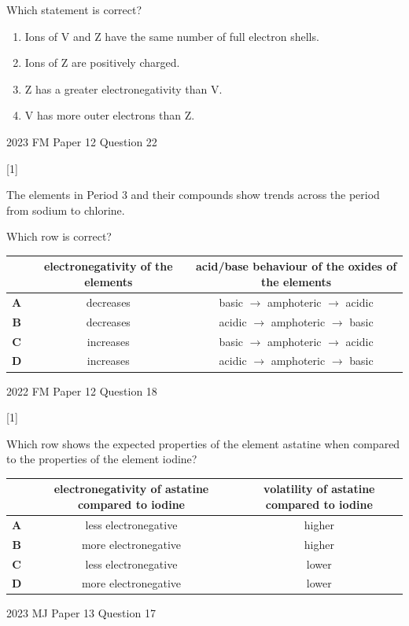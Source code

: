 \documentclass[10pt,a4paper]{article}
\newcommand{\qhead}[2]{%
  \par\vspace{0.28em}%
  \Needspace{4.2em}%
  \noindent{\small\textbf{#1}}\hfill{\small[#2]}\par\vspace{0.08em}%
}
\newcommand{\sourcefoot}[1]{%
  {\footnotesize\color{gray}#1}\par
}
\begin{document}
\vspace{0.12em}
{\small Which statement is correct?}
\begin{enumerate}[label=\textbf{\Alph*}, leftmargin=1.7em, itemsep=0.08em]
\item Ions of V and Z have the same number of full electron shells.
\item Ions of Z are positively charged.
\item Z has a greater electronegativity than V.
\item V has more outer electrons than Z.
\end{enumerate}
\sourcefoot{2023 FM Paper 12 Question 22}

\Needspace{11em}
\qhead{A3.}{1}
{\small The elements in Period 3 and their compounds show trends across the period from sodium to chlorine.}

{\small Which row is correct?}

\vspace{0.12em}
\centering
{\small
\begin{tabular}{ccc}
\toprule
 & electronegativity of the elements & acid/base behaviour of the oxides of the elements \\
\midrule
\textbf{A} & decreases & basic $\rightarrow$ amphoteric $\rightarrow$ acidic \\
\textbf{B} & decreases & acidic $\rightarrow$ amphoteric $\rightarrow$ basic \\
\textbf{C} & increases & basic $\rightarrow$ amphoteric $\rightarrow$ acidic \\
\textbf{D} & increases & acidic $\rightarrow$ amphoteric $\rightarrow$ basic \\
\bottomrule
\end{tabular}}
\par\raggedright
\sourcefoot{2022 FM Paper 12 Question 18}

\qhead{A4.}{1}
{\small Which row shows the expected properties of the element astatine when compared to the properties of the element iodine?}

\vspace{0.12em}
\centering
{\small
\begin{tabular}{ccc}
\toprule
 & electronegativity of astatine compared to iodine & volatility of astatine compared to iodine \\
\midrule
\textbf{A} & less electronegative & higher \\
\textbf{B} & more electronegative & higher \\
\textbf{C} & less electronegative & lower \\
\textbf{D} & more electronegative & lower \\
\bottomrule
\end{tabular}}
\par\raggedright
\sourcefoot{2023 MJ Paper 13 Question 17}
\end{document}
